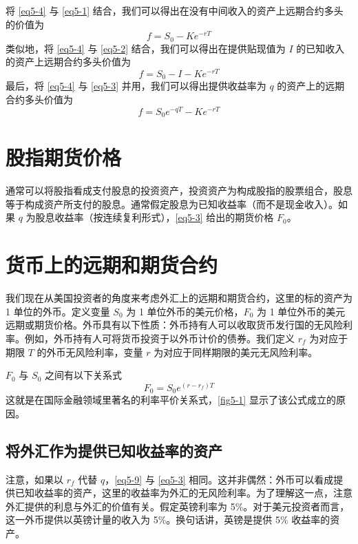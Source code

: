 将 \autoref{eq5-4} 与 \autoref{eq5-1} 结合，我们可以得出在没有中间收入的资产上远期合约多头的价值为
\begin{equation}\label{eq5-5}
    f=S_0-Ke^{-rT}
\end{equation}
类似地，将 \autoref{eq5-4} 与 \autoref{eq5-2} 结合，我们可以得出在提供贴现值为 $I$ 的已知收入的资产上远期合约多头价值为
\begin{equation}\label{eq5-6}
    f=S_0-I-Ke^{-rT}
\end{equation}
最后，将 \autoref{eq5-4} 与 \autoref{eq5-3} 并用，我们可以得出提供收益率为 $q$ 的资产上的远期合约多头价值为
\begin{equation}\label{eq5-7}
    f=S_0e^{-qT}-Ke^{-rT}
\end{equation}
\section{股指期货价格}
通常可以将股指看成支付股息的投资资产，投资资产为构成股指的股票组合，股息等于构成资产所支付的股息。通常假定股息为已知收益率（而不是现金收入）。如果 $q$ 为股息收益率（按连续复利形式），\autoref{eq5-3} 给出的期货价格 $F_0$。
\section{货币上的远期和期货合约}
我们现在从美国投资者的角度来考虑外汇上的远期和期货合约，这里的标的资产为 1 单位的外币。定义变量 $S_0$ 为 1 单位外币的美元价格，$F_0$ 为 1 单位外币的美元远期或期货价格。外币具有以下性质：外币持有人可以收取货币发行国的无风险利率。例如，外币持有人可将货币投资于以外币计价的债券。我们定义 $r_f$ 为对应于期限 $T$ 的外币无风险利率，变量 $r$ 为对应于同样期限的美元无风险利率。

$F_0$ 与 $S_0$ 之间有以下关系式
\begin{equation}\label{eq5-9}
    F_0=S_0e^{(r-r_f)T}
\end{equation}
这就是在国际金融领域里著名的利率平价关系式，\autoref{fig5-1} 显示了该公式成立的原因。

\subsection*{将外汇作为提供已知收益率的资产}
注意，如果以 $r_f$ 代替 $q$，\autoref{eq5-9} 与 \autoref{eq5-3} 相同。这并非偶然：外币可以看成提供已知收益率的资产，这里的收益率为外汇的无风险利率。为了理解这一点，注意外汇提供的利息与外汇的价值有关。假定英镑利率为 5\%。对于美元投资者而言，这一外币提供以英镑计量的收入为 5\%。换句话讲，英镑是提供 5\% 收益率的资产。

